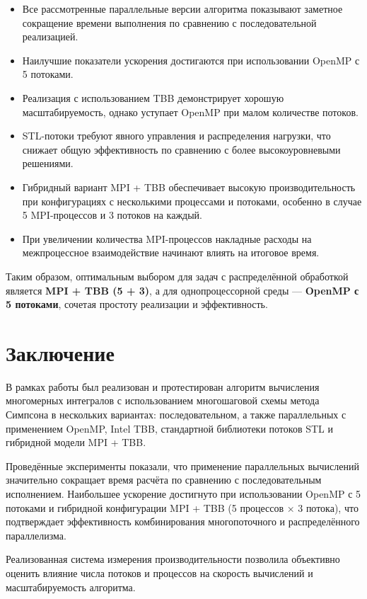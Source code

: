\documentclass[a4paper,12pt]{article}
\begin{document}
\begin{itemize}
    \item Все рассмотренные параллельные версии алгоритма показывают заметное сокращение времени выполнения по сравнению с последовательной реализацией.
    \item Наилучшие показатели ускорения достигаются при использовании OpenMP с 5 потоками.
    \item Реализация с использованием TBB демонстрирует хорошую масштабируемость, однако уступает OpenMP при малом количестве потоков.
    \item STL-потоки требуют явного управления и распределения нагрузки, что снижает общую эффективность по сравнению с более высокоуровневыми решениями.
    \item Гибридный вариант MPI + TBB обеспечивает высокую производительность при конфигурациях с несколькими процессами и потоками, особенно в случае 5 MPI-процессов и 3 потоков на каждый.
    \item При увеличении количества MPI-процессов накладные расходы на межпроцессное взаимодействие начинают влиять на итоговое время.
\end{itemize}

Таким образом, оптимальным выбором для задач с распределённой обработкой является \textbf{MPI + TBB (5 + 3)}, 
а для однопроцессорной среды — \textbf{OpenMP с 5 потоками}, сочетая простоту реализации и эффективность.

\section{Заключение}

В рамках работы был реализован и протестирован алгоритм вычисления многомерных интегралов с использованием многошаговой схемы метода Симпсона в нескольких вариантах: последовательном, а также параллельных с применением OpenMP, Intel TBB, стандартной библиотеки потоков STL и гибридной модели MPI + TBB.

Проведённые эксперименты показали, что применение параллельных вычислений значительно сокращает время расчёта по сравнению с последовательным исполнением. Наибольшее ускорение достигнуто при использовании OpenMP с 5 потоками и гибридной конфигурации MPI + TBB (5 процессов × 3 потока), что подтверждает эффективность комбинирования многопоточного и распределённого параллелизма.

Реализованная система измерения производительности позволила объективно оценить влияние числа потоков и процессов на скорость вычислений и масштабируемость алгоритма.
\end{document}

